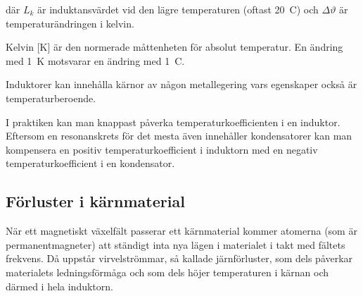 där \(L_k\) är induktansvärdet vid den lägre temperaturen (oftast
20~\degree C) och \(\Delta\vartheta\) är temperaturändringen i kelvin.

Kelvin [K] är den normerade måttenheten för absolut temperatur.
En ändring med 1~K motsvarar en ändring med 1~\degree C.

Induktorer kan innehålla kärnor av någon metallegering vars egenskaper också är
temperaturberoende.

I praktiken kan man knappast påverka temperaturkoefficienten i en induktor.
Eftersom en resonanskrets för det mesta även innehåller kondensatorer kan
man kompensera en positiv temperaturkoefficient i induktorn med en negativ
temperaturkoefficient i en kondensator.

\subsection{Förluster i kärnmaterial}

När ett magnetiskt växelfält passerar ett kärnmaterial kommer atomerna (som
är permanentmagneter) att ständigt inta nya lägen i materialet i takt med
fältets frekvens. Då uppstår virvelströmmar, så kallade järnförluster, som dels
påverkar materialets ledningsförmåga och som dels höjer temperaturen i kärnan 
och därmed i hela induktorn.
